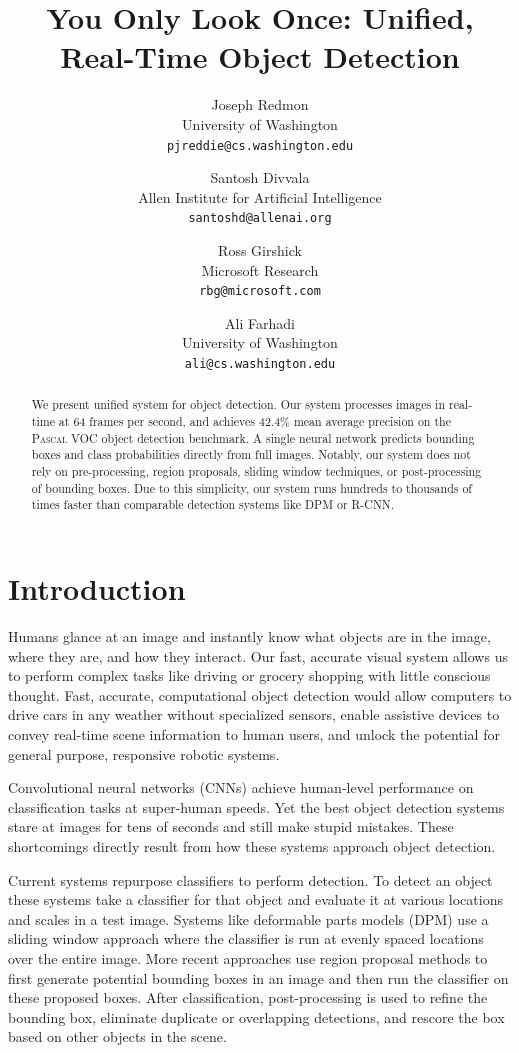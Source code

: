 \documentclass{article} %
\title{You Only Look Once: Unified, Real-Time Object Detection}
\author{Joseph Redmon\\
University of Washington\\
\texttt{pjreddie@cs.washington.edu}
\and
Santosh Divvala\\
Allen Institute for Artificial Intelligence\\
\texttt{santoshd@allenai.org}
\and
Ross Girshick\\
Microsoft Research\\
\texttt{rbg@microsoft.com}
\and
Ali Farhadi\\
University of Washington\\
\texttt{ali@cs.washington.edu}
}
\begin{document}
\maketitle

\begin{abstract}
We present unified system for object detection. Our system processes images in real-time at 64 frames per second, and achieves 42.4\% mean average precision on the \textsc{Pascal} VOC object detection benchmark. A single neural network predicts bounding boxes and class probabilities directly from full images. Notably, our system does not rely on pre-processing, region proposals, sliding window techniques, or post-processing of bounding boxes. Due to this simplicity, our system runs hundreds to thousands of times faster than comparable detection systems like DPM or R-CNN.
\end{abstract}

\section{Introduction}

Humans glance at an image and instantly know what objects are in the image, where they are, and how they interact. Our fast, accurate visual system allows us to perform complex tasks like driving or grocery shopping with little conscious thought. Fast, accurate, computational object detection would allow computers to drive cars in any weather without specialized sensors, enable assistive devices to convey real-time scene information to human users, and unlock the potential for general purpose, responsive robotic systems.

Convolutional neural networks (CNNs) achieve human-level performance on classification tasks at super-human speeds. Yet the best object detection systems stare at images for tens of seconds and still make stupid mistakes. These shortcomings directly result from how these systems approach object detection.

Current systems repurpose classifiers to perform detection. To detect an object these systems take a classifier for that object and evaluate it at various locations and scales in a test image. Systems like deformable parts models (DPM) use a sliding window approach where the classifier is run at evenly spaced locations over the entire image. More recent approaches use region proposal methods to first generate potential bounding boxes in an image and then run the classifier on these proposed boxes. After classification, post-processing is used to refine the bounding box, eliminate duplicate or overlapping detections, and rescore the box based on other objects in the scene.
\end{document}
